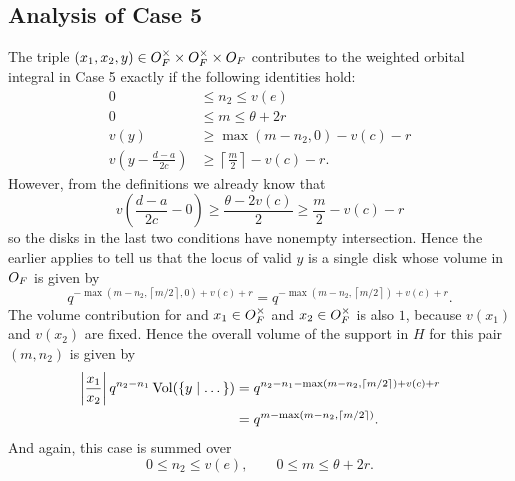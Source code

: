 \subsection{Analysis of Case 5}
The triple $(x_1, x_2, y) \in O_F^\times \times O_F^\times \times O_F$
contributes to the weighted orbital integral in Case 5 exactly if the following identities hold:
\begin{align*}
  0 &\le n_2 \le v(e) \\
  0 &\le m \le \theta + 2r \\
  v(y) &\ge \max(m-n_2,0) - v(c) - r \\
  v\left( y - \frac{d-a}{2c} \right) &\ge \left\lceil \frac{m}{2} \right\rceil - v(c) - r.
\end{align*}
However, from the definitions we already know that
\[ v\left( \frac{d-a}{2c} - 0 \right)
  \ge \frac{\theta - 2v(c)}{2} \ge \frac{m}{2} - v(c) - r \]
so the disks in the last two conditions have nonempty intersection.
Hence the earlier  applies to tell us that
the locus of valid $y$ is a single disk whose volume in $O_F$ is given by
\[ q^{-\max\left( m-n_2, \left\lceil m/2 \right\rceil, 0 \right) + v(c) + r}
  = q^{-\max\left( m-n_2, \left\lceil m/2 \right\rceil \right) + v(c) + r}. \]
The volume contribution for and $x_1 \in O_F^\times$ and $x_2 \in O_F^\times$
is also $1$, because $v(x_1)$ and $v(x_2)$ are fixed.
Hence the overall volume of the support in $H$ for this pair $(m, n_2)$ is given by
\begin{align*}
  \left\lvert \frac{x_1}{x_2} \right\rvert q^{n_2 - n_1} \operatorname{Vol}(\{ y \mid \dots \})
  &= q^{n_2 - n_1 -\max\left( m-n_2, \left\lceil m/2 \right\rceil \right) + v(c) + r} \\
  &= q^{m - \max\left( m-n_2, \left\lceil m/2 \right\rceil \right)}.
\end{align*}
And again, this case is summed over
\[ 0 \le n_2 \le v(e), \qquad 0 \le m \le \theta + 2r. \]

